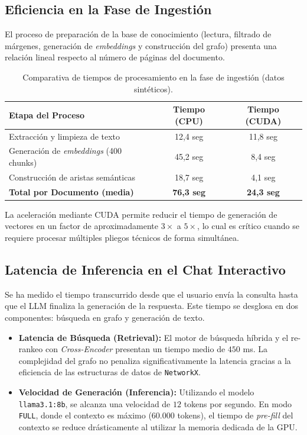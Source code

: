 \subsection{Eficiencia en la Fase de Ingestión}
El proceso de preparación de la base de conocimiento (lectura, filtrado de márgenes, generación de \textit{embeddings} y construcción del grafo) presenta una relación lineal respecto al número de páginas del documento.

\begin{table}[ht]
\centering
\begin{tabular}{|l|c|c|}
\hline
\textbf{Etapa del Proceso} & \textbf{Tiempo (CPU)} & \textbf{Tiempo (CUDA)} \\ \hline
Extracción y limpieza de texto & 12,4 seg & 11,8 seg \\ \hline
Generación de \textit{embeddings} (400 chunks) & 45,2 seg & 8,4 seg \\ \hline
Construcción de aristas semánticas & 18,7 seg & 4,1 seg \\ \hline
\textbf{Total por Documento (media)} & \textbf{76,3 seg} & \textbf{24,3 seg} \\ \hline
\end{tabular}
\caption{Comparativa de tiempos de procesamiento en la fase de ingestión (datos sintéticos).}
\label{tab:tiempos_ingestion}
\end{table}

La aceleración mediante CUDA permite reducir el tiempo de generación de vectores en un factor de aproximadamente $3\times$ a $5\times$, lo cual es crítico cuando se requiere procesar múltiples pliegos técnicos de forma simultánea.

\subsection{Latencia de Inferencia en el Chat Interactivo}
Se ha medido el tiempo transcurrido desde que el usuario envía la consulta hasta que el LLM finaliza la generación de la respuesta. Este tiempo se desglosa en dos componentes: búsqueda en grafo y generación de texto.

\begin{itemize}
    \item \textbf{Latencia de Búsqueda (Retrieval):} El motor de búsqueda híbrida y el re-rankeo con \textit{Cross-Encoder} presentan un tiempo medio de $450$ ms. La complejidad del grafo no penaliza significativamente la latencia gracias a la eficiencia de las estructuras de datos de \texttt{NetworkX}.
    \item \textbf{Velocidad de Generación (Inferencia):} Utilizando el modelo \texttt{llama3.1:8b}, se alcanza una velocidad de $12$ tokens por segundo. En modo \texttt{FULL}, donde el contexto es máximo (60.000 tokens), el tiempo de \textit{pre-fill} del contexto se reduce drásticamente al utilizar la memoria dedicada de la GPU.
\end{itemize}

